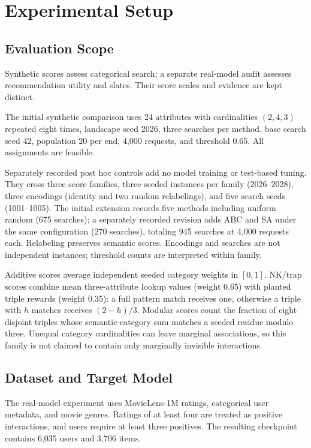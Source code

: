 \section{Experimental Setup}
\label{sec:experimental-setup}

\subsection{Evaluation Scope}
Synthetic scores assess categorical search; a separate real-model audit assesses recommendation utility and slates. Their score scales and evidence are kept distinct.

The initial synthetic comparison uses 24 attributes with cardinalities $(2,4,3)$ repeated eight times, landscape seed 2026, three searches per method, base search seed 42, population 20 per end, 4,000 requests, and threshold 0.65. All assignments are feasible.

Separately recorded post hoc controls add no model training or test-based tuning. They cross three score families, three seeded instances per family (2026--2028), three encodings (identity and two random relabelings), and five search seeds (1001--1005). The initial extension records five methods including uniform random (675 searches); a separately recorded revision adds ABC and SA under the same configuration (270 searches), totaling 945 searches at 4,000 requests each. Relabeling preserves semantic scores. Encodings and searches are not independent instances; threshold counts are interpreted within family.

Additive scores average independent seeded category weights in $[0,1]$. NK/trap scores combine mean three-attribute lookup values (weight 0.65) with planted triple rewards (weight 0.35): a full pattern match receives one, otherwise a triple with $h$ matches receives $(2-h)/3$. Modular scores count the fraction of eight disjoint triples whose semantic-category sum matches a seeded residue modulo three. Unequal category cardinalities can leave marginal associations, so this family is not claimed to contain only marginally invisible interactions.

\subsection{Dataset and Target Model}
The real-model experiment uses MovieLens-1M ratings, categorical user metadata, and movie genres. Ratings of at least four are treated as positive interactions, and users require at least three positives. The resulting checkpoint contains 6,035 users and 3,706 items.

